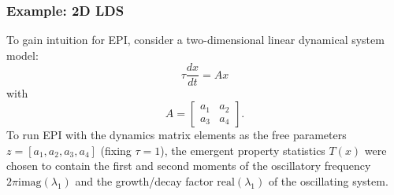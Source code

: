 \documentclass[11pt]{article}
\begin{document}

\subsubsection{Example: 2D LDS}\label{methods_2DLDS}
To gain intuition for EPI, consider a two-dimensional linear dynamical system model:
\begin{equation} 
\tau \frac{dx}{dt} = Ax
\end{equation}
with
\begin{equation}
A = \begin{bmatrix} a_1 & a_2 \\ a_3 & a_4 \end{bmatrix}.
\end{equation}
To run EPI with the dynamics matrix elements as the free parameters $z = [ a_1, a_2, a_3, a_4]$ (fixing $\tau=1$), the emergent property statistics $T(x)$ were chosen to contain the first and second moments of the oscillatory frequency $2 \pi \text{imag}(\lambda_1)$ and the growth/decay factor $\text{real}(\lambda_1)$ of the oscillating system. 
\end{document}

